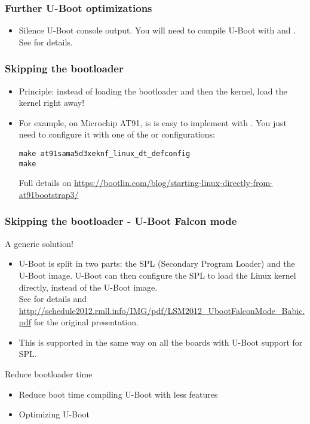 \begin{frame}
\frametitle{Further U-Boot optimizations}
\begin{itemize}
\item Silence U-Boot console output. You will need to compile
      U-Boot with  and
      .\\
      See  for details.
\end{itemize}
\end{frame}

\begin{frame}[fragile]
\frametitle{Skipping the bootloader}
\begin{itemize}
\item Principle: instead of loading the bootloader and then the kernel,
      load the kernel right away!
\item For example, on Microchip AT91, is is easy to implement with
      . You just need to configure it
      with one of the  or  configurations:
\begin{block}{}
\begin{verbatim}
make at91sama5d3xeknf_linux_dt_defconfig
make
\end{verbatim}
\end{block}
      Full details on
      \url{https://bootlin.com/blog/starting-linux-directly-from-at91bootstrap3/}
\end{itemize}
\end{frame}

\begin{frame}[fragile]
\frametitle{Skipping the bootloader - U-Boot Falcon mode}
A generic solution!
\begin{itemize}
\item U-Boot is split in two parts: the SPL (Secondary Program Loader)
      and the U-Boot image. U-Boot can then configure the SPL to load
      the Linux kernel directly, instead of the U-Boot image.\\
      See  for details and
      \url{http://schedule2012.rmll.info/IMG/pdf/LSM2012_UbootFalconMode_Babic.pdf}
      for the original presentation.
\item This is supported in the same way on all the boards with U-Boot
support for SPL.
\end{itemize}
\end{frame}

\setuplabframe
{Reduce bootloader time}
{
\begin{itemize}
\item Reduce boot time compiling U-Boot with less features
\item Optimizing U-Boot
\end{itemize}
}

